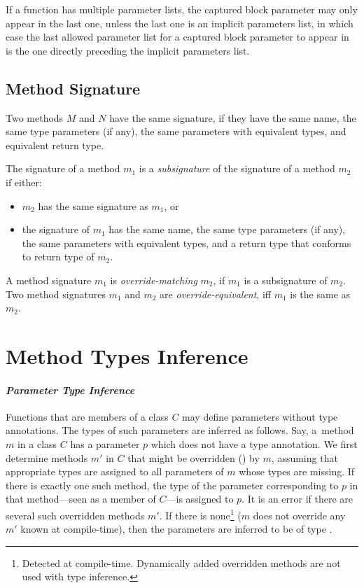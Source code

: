 If a function has multiple parameter lists, the captured block parameter may only appear in the last one, unless the last one is an implicit parameters list, in which case the last allowed parameter list for a captured block parameter to appear in is the one directly preceding the implicit parameters list. 





\subsection{Method Signature}
\label{sec:method-signature}

Two methods $M$ and $N$ have the same signature, if they have the same name, the same type parameters (if any), the same parameters with equivalent types, and equivalent return type. 

The signature of a method $m_1$ is a {\em subsignature} of the signature of a method $m_2$ if either:
\begin{itemize}
\item $m_2$ has the same signature as $m_1$, or
\item the signature of $m_1$ has the same name, the same type parameters (if any), the same parameters with equivalent types, and a return type that conforms to return type of $m_2$. 
\end{itemize}

A method signature $m_1$ is {\em override-matching} $m_2$, if $m_1$ is a subsignature of $m_2$. Two method signatures $m_1$ and $m_2$ are {\em override-equivalent}, iff $m_1$ is the same as $m_2$. 






\section{Method Types Inference}
\label{sec:method-types-inference}

\paragraph{\em Parameter Type Inference}
Functions that are members of a class $C$ may define parameters without type annotations. The types of such parameters are inferred as follows. Say, a~method $m$ in a class $C$ has a parameter $p$ which does not have a type annotation. We first determine methods $m'$ in $C$ that might be overridden () by $m$, assuming that appropriate types are assigned to all parameters of $m$ whose types are missing. If there is exactly one such method, the type of the parameter corresponding to $p$ in that method---seen as a member of $C$---is assigned to $p$. It is an error if there are several such overridden methods $m'$. If there is none\footnote{Detected at compile-time. Dynamically added overridden methods are not used with type inference.} ($m$ does not override any $m'$ known at compile-time), then the parameters are inferred to be of type .

